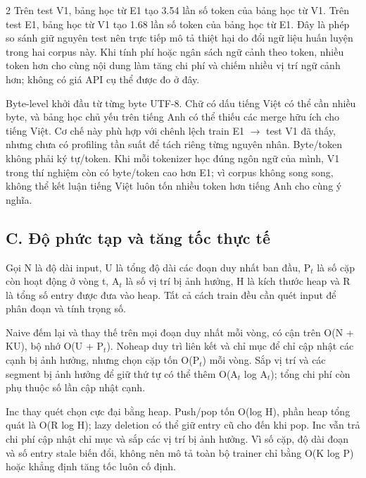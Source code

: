 \documentclass[10pt,letterpaper]{article}
\begin{document}
\begin{multicols}{2}
Trên test V1, bảng học từ E1 tạo 3.54 lần số token của bảng học từ V1. Trên test E1, bảng học từ V1 tạo 1.68 lần số token của bảng học từ E1. Đây là phép so sánh giữ nguyên test nên trực tiếp mô tả thiệt hại do đổi ngữ liệu huấn luyện trong hai corpus này. Khi tính phí hoặc ngân sách ngữ cảnh theo token, nhiều token hơn cho cùng nội dung làm tăng chi phí và chiếm nhiều vị trí ngữ cảnh hơn; không có giá API cụ thể được đo ở đây.

Byte-{}level khởi đầu từ từng byte UTF-{}8. Chữ có dấu tiếng Việt có thể cần nhiều byte, và bảng học chủ yếu trên tiếng Anh có thể thiếu các merge hữu ích cho tiếng Việt. Cơ chế này phù hợp với chênh lệch train E1 \ensuremath{\rightarrow} test V1 đã thấy, nhưng chưa có profiling tần suất để tách riêng từng nguyên nhân. Byte/\allowbreak{}token không phải ký tự/\allowbreak{}token. Khi mỗi tokenizer học đúng ngôn ngữ của mình, V1 trong thí nghiệm còn có byte/\allowbreak{}token cao hơn E1; vì corpus không song song, không thể kết luận tiếng Việt luôn tốn nhiều token hơn tiếng Anh cho cùng ý nghĩa.

\subsection*{C. Độ phức tạp và tăng tốc thực tế}
Gọi N là độ dài input, U là tổng độ dài các đoạn duy nhất ban đầu, P\ensuremath{{}_t} là số cặp còn hoạt động ở vòng t, A\ensuremath{{}_t} là số vị trí bị ảnh hưởng, H là kích thước heap và R là tổng số entry được đưa vào heap. Tất cả cách train đều cần quét input để phân đoạn và tính trọng số.

Naive đếm lại và thay thế trên mọi đoạn duy nhất mỗi vòng, có cận trên O(N + KU), bộ nhớ O(U + P\ensuremath{{}_t}). Noheap duy trì liên kết và chỉ mục để chỉ cập nhật các cạnh bị ảnh hưởng, nhưng chọn cặp tốn O(P\ensuremath{{}_t}) mỗi vòng. Sắp vị trí và các segment bị ảnh hưởng để giữ thứ tự có thể thêm O(A\ensuremath{{}_t} log A\ensuremath{{}_t}); tổng chi phí còn phụ thuộc số lần cập nhật cạnh.

Inc thay quét chọn cực đại bằng heap. Push/\allowbreak{}pop tốn O(log H), phần heap tổng quát là O(R log H); lazy deletion có thể giữ entry cũ cho đến khi pop. Inc vẫn trả chi phí cập nhật chỉ mục và sắp các vị trí bị ảnh hưởng. Vì số cặp, độ dài đoạn và số entry stale biến đổi, không nên mô tả toàn bộ trainer chỉ bằng O(K log P) hoặc khẳng định tăng tốc luôn cố định.

\end{multicols}
\end{document}
